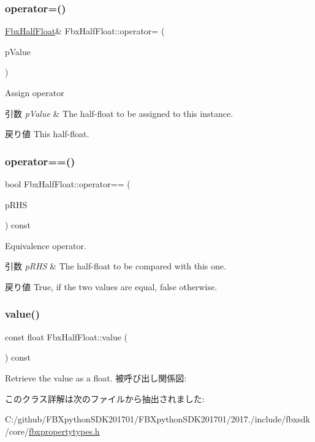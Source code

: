 \subsubsection{\texorpdfstring{operator=()}{operator=()}}
{\footnotesize\ttfamily \hyperlink{class_fbx_half_float}{Fbx\+Half\+Float}\& Fbx\+Half\+Float\+::operator= (\begin{DoxyParamCaption}\item[{const \hyperlink{class_fbx_half_float}{Fbx\+Half\+Float} \&}]{p\+Value }\end{DoxyParamCaption})}

Assign operator 
\begin{DoxyParams}{引数}
{\em p\+Value} & The half-\/float to be assigned to this instance. \\
\hline
\end{DoxyParams}
\begin{DoxyReturn}{戻り値}
This half-\/float. 
\end{DoxyReturn}
\mbox{\label{class_fbx_half_float_a2f0407870ed2ad08a2a97477acfcf193}} 
\subsubsection{\texorpdfstring{operator==()}{operator==()}}
{\footnotesize\ttfamily bool Fbx\+Half\+Float\+::operator== (\begin{DoxyParamCaption}\item[{const \hyperlink{class_fbx_half_float}{Fbx\+Half\+Float} \&}]{p\+R\+HS }\end{DoxyParamCaption}) const}

Equivalence operator. 
\begin{DoxyParams}{引数}
{\em p\+R\+HS} & The half-\/float to be compared with this one. \\
\hline
\end{DoxyParams}
\begin{DoxyReturn}{戻り値}
{\ttfamily True}, if the two values are equal, {\ttfamily false} otherwise. 
\end{DoxyReturn}
\mbox{\label{class_fbx_half_float_a0ee86f74d6747ac89a1081695dd14b37}} 
\subsubsection{\texorpdfstring{value()}{value()}}
{\footnotesize\ttfamily const float Fbx\+Half\+Float\+::value (\begin{DoxyParamCaption}{ }\end{DoxyParamCaption}) const}

Retrieve the value as a float. 被呼び出し関係図\+:


このクラス詳解は次のファイルから抽出されました\+:\begin{DoxyCompactItemize}
\item 
C\+:/github/\+F\+B\+Xpython\+S\+D\+K201701/\+F\+B\+Xpython\+S\+D\+K201701/2017./include/fbxsdk/core/\hyperlink{fbxpropertytypes_8h}{fbxpropertytypes.\+h}\end{DoxyCompactItemize}
